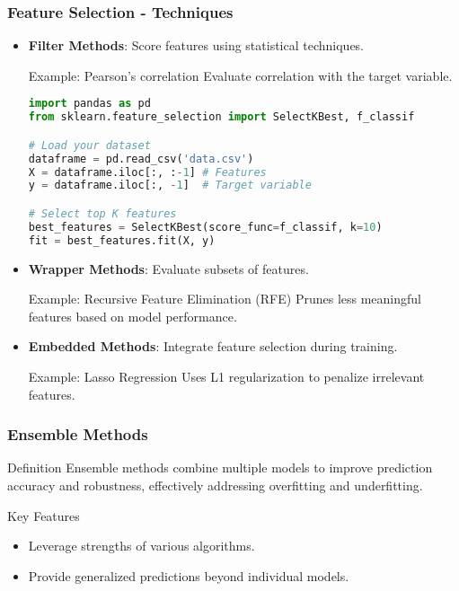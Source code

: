 \documentclass[aspectratio=169]{beamer}
\begin{document}
\begin{frame}[fragile]
    \frametitle{Feature Selection - Techniques}
    \begin{itemize}
        \item \textbf{Filter Methods}: Score features using statistical techniques.
            \begin{block}{Example: Pearson's correlation}
                Evaluate correlation with the target variable.
            \end{block}
            \begin{lstlisting}[language=Python]
import pandas as pd
from sklearn.feature_selection import SelectKBest, f_classif

# Load your dataset
dataframe = pd.read_csv('data.csv')
X = dataframe.iloc[:, :-1] # Features
y = dataframe.iloc[:, -1]  # Target variable

# Select top K features
best_features = SelectKBest(score_func=f_classif, k=10)
fit = best_features.fit(X, y)
                \end{lstlisting}

        \item \textbf{Wrapper Methods}: Evaluate subsets of features.
            \begin{block}{Example: Recursive Feature Elimination (RFE)}
                Prunes less meaningful features based on model performance.
            \end{block}
        
        \item \textbf{Embedded Methods}: Integrate feature selection during training.
            \begin{block}{Example: Lasso Regression}
                Uses L1 regularization to penalize irrelevant features.
            \end{block}
    \end{itemize}
\end{frame}

\begin{frame}[fragile]
    \frametitle{Ensemble Methods}
    \begin{block}{Definition}
        Ensemble methods combine multiple models to improve prediction accuracy and robustness, effectively addressing overfitting and underfitting. 
    \end{block}
    \begin{block}{Key Features}
        \begin{itemize}
            \item Leverage strengths of various algorithms.
            \item Provide generalized predictions beyond individual models.
        \end{itemize}
    \end{block}
\end{frame}
\end{document}
